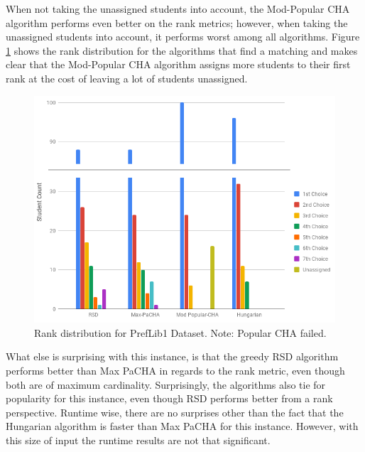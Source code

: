 When not taking the unassigned students into account, the Mod-Popular CHA algorithm performs even better on the rank metrics; however, when taking the unassigned students into account, it performs worst among all algorithms. Figure \ref{fig:preflib1-rank-distribution} shows the rank distribution for the algorithms that find a matching and makes clear that the Mod-Popular CHA algorithm assigns more students to their first rank at the cost of leaving a lot of students unassigned. 

\begin{figure}[h!]
  \centering
    \includegraphics[width=0.9\linewidth]{assets/plots/preflib1-cropped.png}
    \caption{Rank distribution for PrefLib1 Dataset. Note: Popular CHA failed.}
    \label{fig:preflib1-rank-distribution}
\end{figure}

What else is surprising with this instance, is that the greedy RSD algorithm performs better than Max PaCHA in regards to the rank metric, even though both are of maximum cardinality. Surprisingly, the algorithms also tie for popularity for this instance, even though RSD performs better from a rank perspective. Runtime wise, there are no surprises other than the fact that the Hungarian algorithm is faster than Max PaCHA for this instance. However, with this size of input the runtime results are not that significant.

